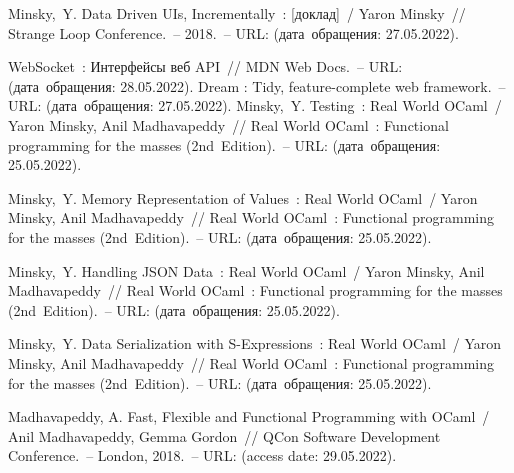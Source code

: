 \begin{thebibliography}{00}
      Minsky,~Y. Data Driven UIs, Incrementally~: [доклад]~/ Yaron Minsky~//
      Strange Loop Conference.~--
      2018.~--
      URL: \underline{}
      (дата~обращения: 27.05.2022).
      
      WebSocket~: Интерфейсы веб API~// MDN Web Docs.~--
      URL: \underline{}
      (дата~обращения: 28.05.2022). 
        Dream : Tidy, feature-complete web framework.~--
        URL: \underline{}
        (дата~обращения: 27.05.2022). 
      Minsky,~Y. Testing~: Real World OCaml~/
      Yaron Minsky, Anil Madhavapeddy~//
      Real World OCaml~: Functional programming for the masses (2nd~Edition).~--
      URL: \underline{} (дата~обращения: 25.05.2022).
      
      Minsky,~Y. Memory Representation of Values~: Real World OCaml~/
      Yaron Minsky, Anil Madhavapeddy~//
      Real World OCaml~: Functional programming for the masses (2nd~Edition).~--
      URL: \underline{} (дата~обращения: 25.05.2022).
      
      Minsky,~Y. Handling JSON Data~: Real World OCaml~/
      Yaron Minsky, Anil Madhavapeddy~//
      Real World OCaml~: Functional programming for the masses (2nd~Edition).~--
      URL: \underline{} (дата~обращения: 25.05.2022).
      
      Minsky,~Y. Data Serialization with S-Expressions~: Real World OCaml~/
      Yaron Minsky, Anil Madhavapeddy~//
      Real World OCaml~: Functional programming for the masses (2nd~Edition).~--
      URL: \underline{} (дата~обращения: 25.05.2022).
      
      Madhavapeddy, A. Fast, Flexible and Functional Programming with OCaml~/
      Anil Madhavapeddy, Gemma Gordon~// QCon Software Development Conference.~--
      London, 2018.~--
      URL: \underline{}
      (access date: 29.05.2022).
    

\end{thebibliography}
